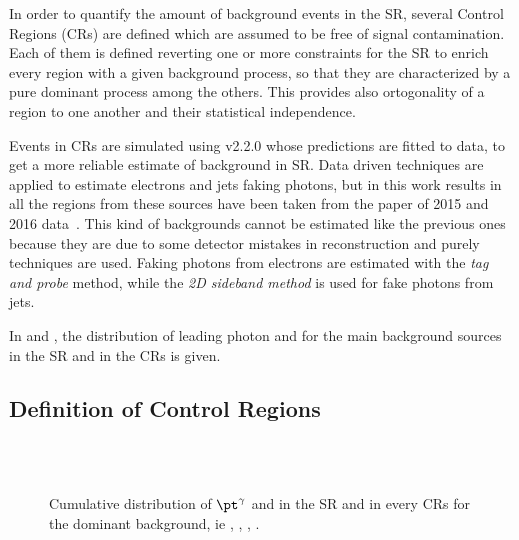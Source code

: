 In order to quantify the amount of background events in the SR, several Control Regions (CRs) are defined which are assumed to be free of signal contamination. Each of them is defined reverting one or more constraints for the SR to enrich every region with a given background process, so that they are characterized by a pure dominant process among the others. This provides also ortogonality of a region to one another and their statistical independence.

Events in CRs are simulated using \SHERPA v2.2.0 whose predictions are fitted to data, to get a more reliable estimate of background in SR. Data driven techniques are applied to estimate electrons and jets faking photons, but in this work results in all the regions from these sources have been taken from the \mph paper of 2015 and 2016 data~\cite{paperMP}. This kind of backgrounds cannot be estimated like the previous ones because they are due to some detector mistakes in reconstruction and purely \insitu techniques are used. Faking photons from electrons are estimated with the \emph{tag and probe} method, while the \emph{2D sideband method} is used for fake photons from jets.

In \Fig{\ref{fig:prefit}} and \Fig{\ref{fig:prefitcont}}, the distribution of leading photon \pt and \met for the main background sources in the SR and in the CRs is given.

\subsection{Definition of Control Regions}
\begin{figure}[p]
\centering
{} \quad
{} \\

 \quad
{} \\

\caption{Cumulative distribution of $\pt^{\gamma}$ and \met in the SR and in every CRs for the dominant background, ie \znng, \zg, \wg, \gj.}
\label{fig:prefit}
\end{figure}

